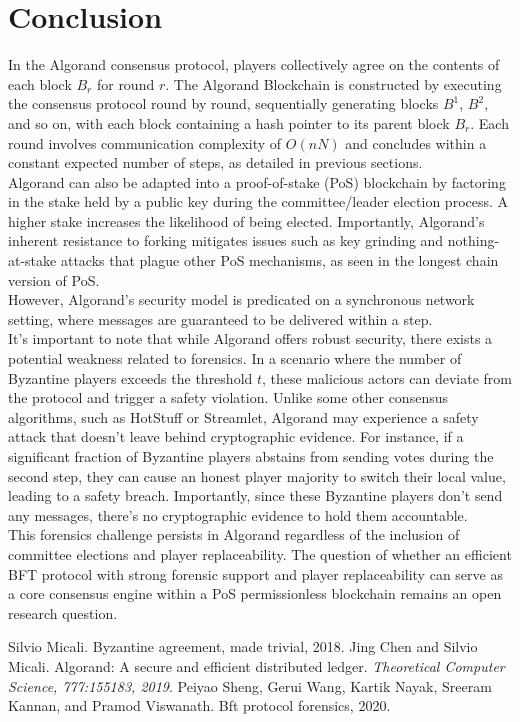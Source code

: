 \documentclass{report}
\begin{document}
\section{Conclusion}
In the Algorand consensus protocol, players collectively agree on the contents of each block $B_{r}$ for round $r$. The Algorand Blockchain is constructed by executing the consensus protocol round by round, sequentially generating blocks $B^{1}$, $B^{2}$, and so on, with each block containing a hash pointer to its parent block $B_{r}$. Each round involves communication complexity of $O(nN)$ and concludes within a constant expected number of steps, as detailed in previous sections.\\
Algorand can also be adapted into a proof-of-stake (PoS) blockchain by factoring in the stake held by a public key during the committee/leader election process. A higher stake increases the likelihood of being elected. Importantly, Algorand's inherent resistance to forking mitigates issues such as key grinding and nothing-at-stake attacks that plague other PoS mechanisms, as seen in the longest chain version of PoS.\\
However, Algorand's security model is predicated on a synchronous network setting, where messages are guaranteed to be delivered within a step.\\
It's important to note that while Algorand offers robust security, there exists a potential weakness related to forensics. In a scenario where the number of Byzantine players exceeds the threshold $t$, these malicious actors can deviate from the protocol and trigger a safety violation. Unlike some other consensus algorithms, such as HotStuff or Streamlet, Algorand may experience a safety attack that doesn't leave behind cryptographic evidence. For instance, if a significant fraction of Byzantine players abstains from sending votes during the second step, they can cause an honest player majority to switch their local value, leading to a safety breach. Importantly, since these Byzantine players don't send any messages, there's no cryptographic evidence to hold them accountable.\\
This forensics challenge persists in Algorand regardless of the inclusion of committee elections and player replaceability. The question of whether an efficient BFT protocol with strong forensic support and player replaceability can serve as a core consensus engine within a PoS permissionless blockchain remains an open research question.

\renewcommand{\bibname}{References}
\begin{thebibliography}{9}
	 Silvio Micali. Byzantine agreement, made trivial, 2018.
	 Jing Chen and Silvio Micali. Algorand: A secure and efficient distributed ledger. \textit{Theoretical Computer Science, 777:155183, 2019}.
	 Peiyao Sheng, Gerui Wang, Kartik Nayak, Sreeram Kannan, and Pramod Viswanath. Bft protocol forensics, 2020.
\end{thebibliography}
\end{document}
